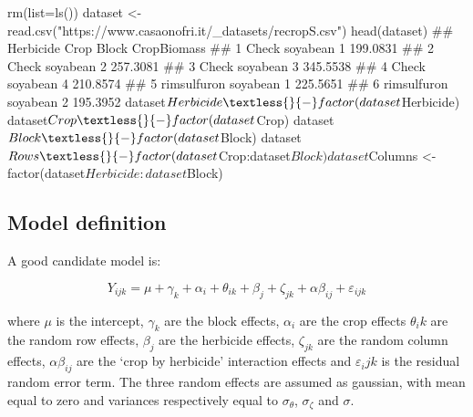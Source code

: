 \documentclass[a4paper,12pt,oneside]{book}
\newenvironment{Shaded}{\begin{snugshade}}{\end{snugshade}}
\newcommand{\SpecialCharTok}[1]{#1}
\newcommand{\StringTok}[1]{#1}
\newcommand{\DocumentationTok}[1]{#1}
\newcommand{\OtherTok}[1]{#1}
\newcommand{\FunctionTok}[1]{#1}
\newcommand{\AttributeTok}[1]{#1}
\newcommand{\NormalTok}[1]{#1}
\begin{document}
\begin{Shaded}
\begin{Highlighting}[]
\FunctionTok{rm}\NormalTok{(}\AttributeTok{list=}\FunctionTok{ls}\NormalTok{())}
\NormalTok{dataset }\OtherTok{\textless{}{-}} \FunctionTok{read.csv}\NormalTok{(}\StringTok{"https://www.casaonofri.it/\_datasets/recropS.csv"}\NormalTok{)}
\FunctionTok{head}\NormalTok{(dataset)}
\DocumentationTok{\#\#     Herbicide     Crop Block CropBiomass}
\DocumentationTok{\#\# 1       Check soyabean     1    199.0831}
\DocumentationTok{\#\# 2       Check soyabean     2    257.3081}
\DocumentationTok{\#\# 3       Check soyabean     3    345.5538}
\DocumentationTok{\#\# 4       Check soyabean     4    210.8574}
\DocumentationTok{\#\# 5 rimsulfuron soyabean     1    225.5651}
\DocumentationTok{\#\# 6 rimsulfuron soyabean     2    195.3952}
\NormalTok{dataset}\SpecialCharTok{$}\NormalTok{Herbicide }\OtherTok{\textless{}{-}} \FunctionTok{factor}\NormalTok{(dataset}\SpecialCharTok{$}\NormalTok{Herbicide)}
\NormalTok{dataset}\SpecialCharTok{$}\NormalTok{Crop }\OtherTok{\textless{}{-}} \FunctionTok{factor}\NormalTok{(dataset}\SpecialCharTok{$}\NormalTok{Crop)}
\NormalTok{dataset}\SpecialCharTok{$}\NormalTok{Block }\OtherTok{\textless{}{-}} \FunctionTok{factor}\NormalTok{(dataset}\SpecialCharTok{$}\NormalTok{Block)}
\NormalTok{dataset}\SpecialCharTok{$}\NormalTok{Rows }\OtherTok{\textless{}{-}} \FunctionTok{factor}\NormalTok{(dataset}\SpecialCharTok{$}\NormalTok{Crop}\SpecialCharTok{:}\NormalTok{dataset}\SpecialCharTok{$}\NormalTok{Block)}
\NormalTok{dataset}\SpecialCharTok{$}\NormalTok{Columns }\OtherTok{\textless{}{-}} \FunctionTok{factor}\NormalTok{(dataset}\SpecialCharTok{$}\NormalTok{Herbicide}\SpecialCharTok{:}\NormalTok{dataset}\SpecialCharTok{$}\NormalTok{Block)}
\end{Highlighting}
\end{Shaded}

\hypertarget{model-definition-5}{%
\subsection{Model definition}\label{model-definition-5}}

A good candidate model is:

\[Y_{ijk} = \mu + \gamma_k + \alpha_i + \theta_{ik} + \beta_j + \zeta_{jk} + \alpha\beta_{ij} + \varepsilon_{ijk}\]

where \(\mu\) is the intercept, \(\gamma_k\) are the block effects, \(\alpha_i\) are the crop effects \(\theta_ik\) are the random row effects, \(\beta_j\) are the herbicide effects, \(\zeta_{jk}\) are the random column effects, \(\alpha\beta_{ij}\) are the `crop by herbicide' interaction effects and \(\varepsilon_ijk\) is the residual random error term. The three random effects are assumed as gaussian, with mean equal to zero and variances respectively equal to \(\sigma_{\theta}\), \(\sigma_{\zeta}\) and \(\sigma\).
\end{document}
